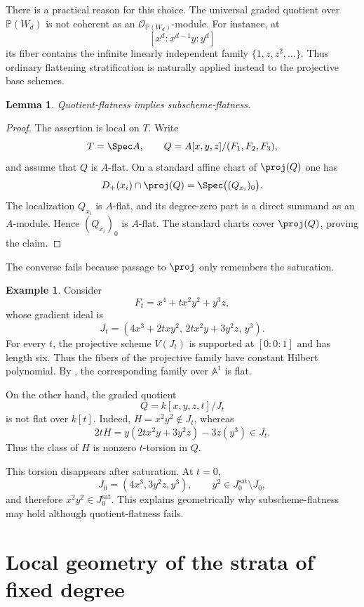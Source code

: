 \documentclass[11pt]{amsart} %
\newtheorem{Lemma}[Theorem]{Lemma}
\theoremstyle{definition}
\newtheorem{Example}[Theorem]{Example}
\def\NZQ{\mathbb}               %
\def\PP{{\NZQ P}}
\begin{document}
There is a practical reason for this choice. The universal graded
quotient over $\PP(W_d)$ is not coherent as an
$\mathcal O_{\PP(W_d)}$-module. For instance, at
\[
[x^d:x^{d-1}y:y^d]
\]
its fiber contains the infinite linearly independent family \(\{1,z,z^2,\ldots\}.\)
Thus ordinary flattening stratification is naturally applied instead
to the projective base schemes.

\begin{Lemma}\label{lem:quot-flatness-implies-subscheme-flatness}
Quotient-flatness implies subscheme-flatness.
\end{Lemma}

\begin{proof}
The assertion is local on $T$. Write
\[
T=\Spec A,
\qquad
Q=A[x,y,z]/(F_1,F_2,F_3),
\]
and assume that $Q$ is $A$-flat. On a standard affine chart of
$\proj(Q)$ one has
\[
D_+(x_i)\cap\proj(Q)
=
\Spec\bigl((Q_{x_i})_0\bigr).
\]
The localization $Q_{x_i}$ is $A$-flat, and its degree-zero
part is a direct summand as an $A$-module. Hence
$(Q_{x_i})_0$ is $A$-flat. The standard charts cover
$\proj(Q)$, proving the claim.
\end{proof}

The converse fails because passage to $\proj$ only remembers the
saturation.

\begin{Example}\label{ex:subscheme-flat-and-quot-flat}
Consider
\[
F_t=x^4+t x^2y^2+y^3z,
\]
whose gradient ideal is
\[
J_t=
(4x^3+2txy^2,\,
 2tx^2y+3y^2z,\,
 y^3).
\]
For every $t$, the projective scheme $V(J_t)$ is supported at $[0:0:1]$ and has length six. Thus the fibers of the projective family have constant Hilbert polynomial. By \cite[Chapter~III, Theorem~9.9]{hartshorne2013algebraic},
the corresponding family over $\mathbb A^1$ is flat.

On the other hand, the graded quotient
\[
Q=k[x,y,z,t]/J_t
\]
is not flat over $k[t]$. Indeed, \(H=x^2y^2\notin J_t
\), whereas
\[
2tH
=
y(2tx^2y+3y^2z)-3z(y^3)
\in J_t.
\]
Thus the class of $H$ is nonzero $t$-torsion in $Q$.

This torsion disappears after saturation. At $t=0$,
\[
J_0=(4x^3,3y^2z,y^3),
\qquad
y^2\in J_0^{\mathrm{sat}}\setminus J_0,
\]
and therefore \(x^2y^2\in J_0^{\mathrm{sat}}\). This explains geometrically why subscheme-flatness may hold although
quotient-flatness fails.
\end{Example}

\section{Local geometry of the strata of fixed degree}\label{sec:local-geometry}
\end{document}
